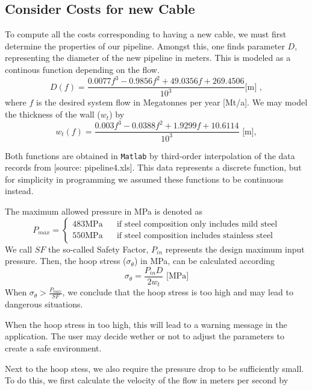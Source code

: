 \documentclass{article}
\begin{document}
\subsection{Consider Costs for new Cable}
To compute all the costs corresponding to having a new cable, we must first determine the properties of our pipeline. Amongst this, one finds parameter $D$, representing the diameter of the new pipeline in meters. This is modeled as a continous function depending on the flow. 
\begin{equation}
\label{eq:diameter}
D(f) = \frac{0.0077f^3 - 0.9856f^2 +49.0356f + 269.4506}{10^3} \text{[m] },
\end{equation}
where $f$ is the desired system flow in Megatonnes per year [Mt/a]. We may model the thickness of the wall ($w_t$) by
\begin{equation}
w_t(f) = \frac{0.003f^3 -0.0388f^2 +1.9299f + 10.6114}{10^3} \text{ [m]}, 
\end{equation}
\begin{info}
Both functions are obtained in \texttt{Matlab} by third-order interpolation of the data records from [source: pipeline4.xls]. This data represents a discrete function, but for simplicity in programming we assumed these functions to be continuous instead. 
\end{info}
The maximum allowed pressure in MPa is denoted as
\begin{equation}
P_{max} = 
\begin{cases} 
483 \text{MPa } \quad \text{ if steel composition only includes mild steel}\\
550 \text{MPa } \quad \text{ if steel composition includes stainless steel}
\end{cases}
\end{equation}
We call $SF$ the so-called Safety Factor, $P_{in}$ represents the design maximum input pressure. Then, the hoop stress ($\sigma_{\theta}$) in MPa, can be calculated according
\begin{equation}
\sigma_{\theta} = \frac{P_{in}D}{2w_t}  \text{ [MPa]}
\end{equation}
When $\sigma_{\theta} > \frac{P_{max}}{ SF}$, we conclude that the hoop stress is too high and may lead to dangerous situations.
\begin{info}
When the hoop stress in too high, this will lead to a warning message in the application. The user may decide wether or not to adjust the parameters to create a safe environment.
\end{info}
Next to the hoop stess, we also require the pressure drop to be sufficiently small. To do this, we first calculate the velocity of the flow  in meters per second by
\end{document}
